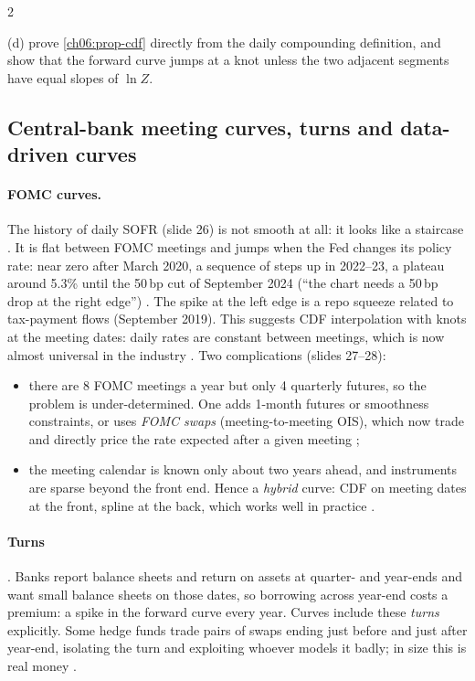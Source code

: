 \begin{paracol}{2}
\begin{exercise}
(d) prove \cref{ch06:prop-cdf} directly from the daily compounding
definition, and show that the forward curve jumps at a knot unless
the two adjacent segments have equal slopes of $\ln Z$.
\end{exercise}

\bigskip

\subsection{Central-bank meeting curves, turns and data-driven curves}\label{ch06:sec-fomc}
\paragraph{FOMC curves.} The history of daily SOFR (slide 26) is not smooth at all: it looks like a staircase
. It is flat between FOMC meetings and jumps when the Fed changes its policy rate: near zero
after March 2020, a sequence of steps up in 2022--23, a plateau around 5.3\% until the 50\,bp cut of September 2024
(``the chart needs a 50\,bp drop at the right edge'') . The spike at the left edge is a repo
squeeze related to tax-payment flows (September 2019). This suggests CDF interpolation with knots at the
meeting dates: daily rates are constant between meetings, which is now almost universal in the industry
. Two complications (slides 27--28):
\begin{itemize}
  \item there are 8 FOMC meetings a year but only 4 quarterly futures, so the problem is under-determined. One
        adds 1-month futures or smoothness constraints, or uses \emph{FOMC swaps} (meeting-to-meeting OIS), which
        now trade and directly price the rate expected after a given meeting ;
  \item the meeting calendar is known only about two years ahead, and instruments are sparse beyond the front end.
        Hence a \emph{hybrid} curve: CDF on meeting dates at the front, spline at the back, which works well in
        practice .
\end{itemize}

\paragraph{Turns} . Banks report balance sheets and return on assets at quarter- and year-ends and
want small balance sheets on those dates, so borrowing across year-end costs a premium: a spike in the forward
curve every year. Curves include these \emph{turns} explicitly. Some hedge funds trade pairs of swaps ending just
before and just after year-end, isolating the turn and exploiting whoever models it badly; in size this is real
money .


\end{paracol}
